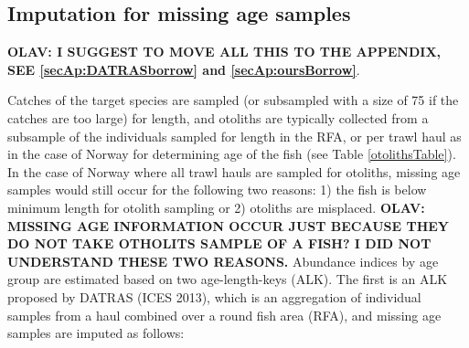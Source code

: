 \documentclass[a4paper 12pt]{article}
\numberwithin{equation}{section}
\begin{document}
\subsection{Imputation for missing age samples}
\label{imputation}
\textbf{OLAV: I SUGGEST TO MOVE ALL THIS TO THE APPENDIX, SEE \ref{secAp:DATRASborrow} and \ref{secAp:oursBorrow}}.

Catches of the target species are sampled (or subsampled with a size of 75 if the catches are too large) for length, and otoliths are typically collected from a subsample of the individuals sampled for length in the RFA,  or per trawl haul as in the case of Norway for determining age of the fish (see Table \ref{otolithsTable}). In the case of Norway where all trawl hauls are sampled for otoliths, missing age samples would still occur for the following two reasons: 1) the fish is below minimum length for otolith sampling or 2) otoliths are misplaced. \textbf{OLAV: MISSING AGE INFORMATION OCCUR JUST BECAUSE THEY DO NOT TAKE OTHOLITS SAMPLE OF A FISH? I DID NOT UNDERSTAND THESE TWO REASONS.}  Abundance indices by age group are estimated based on two age-length-keys (ALK). The first is an ALK proposed by DATRAS (ICES 2013), which is an aggregation of individual samples from a haul combined over a round fish area (RFA), and missing age samples are imputed as follows: 
\end{document}
